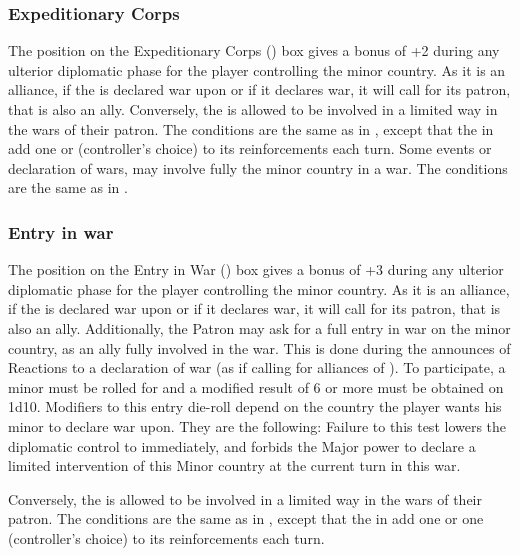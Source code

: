 \subsubsection{Expeditionary Corps}
\aparag The position on the Expeditionary Corps (\CE) box gives a bonus of +2
during any ulterior diplomatic phase for the player controlling the minor
country.
\aparag[Alliance.] As it is an alliance, if the \MIN is declared war upon or
if it declares war, it will call for its patron, that is also an ally.
Conversely, the \MIN is allowed to be involved in a limited way in the wars of
their patron. The conditions are the same as in \AM, except that the \MIN in
\CE add one \LD or \ND (controller's choice) to its reinforcements each turn.
Some events or declaration of wars, may involve fully the minor country in a
war.  The conditions are the same as in \AM.


\subsubsection{Entry in war}\label{chDiplo:EW Effects}
\aparag The position on the Entry in War (\EW) box gives a bonus of +3 during
any ulterior diplomatic phase for the player controlling the minor country.
\aparag[Alliance.] As it is an alliance, if the \MIN is declared war upon or
if it declares war, it will call for its patron, that is also an ally.
\bparag Additionally, the Patron may ask for a full entry in war on the minor
country, as an ally fully involved in the war. This is done during the
announces of Reactions to a declaration of war (as if calling for alliances of
\MAJ).  To participate, a minor must be rolled for and a modified result of 6
or more must be obtained on 1d10.
\bparag
Modifiers to this entry die-roll depend on the country the player wants his
minor to declare war upon. They are the following: \diplowar
\bparag Failure to this test lowers the diplomatic control to \CE immediately,
and forbids the Major power to declare a limited intervention of this Minor
country at the current turn in this war.

Conversely, the \MIN is allowed to be involved in a limited way in the wars of
their patron. The conditions are the same as in \AM, except that the \MIN in
\EG add one \LD or one \ND (controller's choice) to its reinforcements each
turn.

